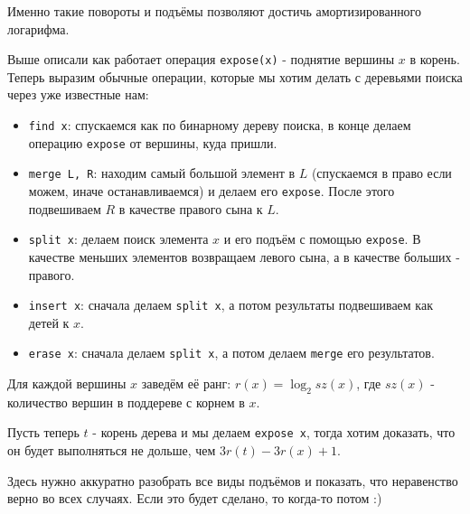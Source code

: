 Именно такие повороты и подъёмы позволяют достичь амортизированного логарифма.


Выше описали как работает операция \texttt{expose(x)} - поднятие вершины $x$ в корень. Теперь выразим обычные операции, которые мы хотим делать с деревьями поиска через уже известные нам:
\begin{itemize}
    \item \texttt{find x}: спускаемся как по бинарному дереву поиска, в конце делаем операцию \texttt{expose} от вершины, куда пришли.
    \item \texttt{merge L, R}: находим самый большой элемент в $L$ (спускаемся в право если можем, иначе останавливаемся) и делаем его \texttt{expose}. После этого подвешиваем $R$ в качестве правого сына к $L$.
    \item \texttt{split x}: делаем поиск элемента $x$ и его подъём с помощью \texttt{expose}. В качестве меньших элементов возвращаем левого сына, а в качестве больших - правого.
    \item \texttt{insert x}: сначала делаем \texttt{split x}, а потом результаты подвешиваем как детей к $x$.
    \item \texttt{erase x}: сначала делаем \texttt{split x}, а потом делаем \texttt{merge} его результатов.
\end{itemize}


Для каждой вершины $x$ заведём её ранг: $r(x) = \log_2 sz(x)$, где $sz(x)$ - количество вершин в поддереве с корнем в $x$.

Пусть теперь $t$ - корень дерева и мы делаем \texttt{expose x}, тогда хотим доказать, что он будет выполняться не дольше, чем $3r(t) - 3r(x) + 1$.

Здесь нужно аккуратно разобрать все виды подъёмов и показать, что неравенство верно во всех случаях. Если это будет сделано, то когда-то потом :)
